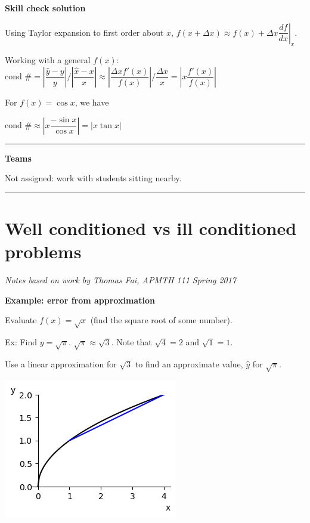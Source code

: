 \documentclass[12pt,letterpaper,noanswers]{exam}
\begin{document}
\noindent \textbf{Skill check solution}

Using Taylor expansion to first order about $x$, $f(x+\Delta x)\approx f(x) + \Delta x \left.\dfrac{df}{dx}\right\vert_x$.

Working with a general $f(x)$:
$\text{cond }\# = \left\vert\dfrac{\hat{y}-y}{y} \right\vert / \left\vert\dfrac{\hat{x}-x}{x} \right\vert \approx \left\vert \dfrac{\Delta xf'(x)}{f(x)} \right\vert / \dfrac{\Delta x}{x} = \left\vert x\dfrac{f'(x)}{f(x)}\right\vert$

For $f(x) = \cos x$, we have

$\text{cond }\# \approx \left\vert x \dfrac{-\sin x}{\cos x} \right\vert  = \vert x\tan x\vert$

\vspace{0.2cm}
\hrule
\vspace{0.2cm}

\noindent \textbf{Teams}

Not assigned: work with students sitting nearby.

\vspace{0.2cm}
\hrule
\vspace{0.2cm}

\section{Well conditioned vs ill conditioned problems}

\noindent \emph{Notes based on work by Thomas Fai, APMTH 111 Spring 2017}

\noindent \textbf{Example: error from approximation}

Evaluate $f(x) = \sqrt{x}$ (find the square root of some number).



Ex: Find $y = \sqrt{\pi}$.   $\sqrt{\pi}\approx \sqrt{3}$.  Note that $\sqrt{4} = 2$ and $\sqrt{1} = 1$.

\noindent Use a linear approximation for $\sqrt{3}$ to find an approximate value, $\hat{y}$ for $\sqrt{\pi}$.
\vspace{1in}

\includegraphics{img/C01linearsqrtapprox.png}
\end{document}
